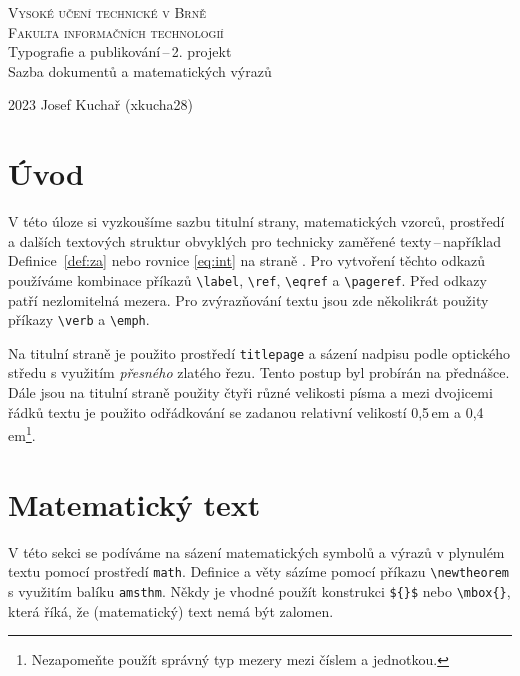 \documentclass[twocolumn,11pt]{article}
\theoremstyle{plain}
\theoremstyle{plain}
\begin{document}
\begin{titlepage}
\begin{center}
{\textsc{{\Huge Vysoké učení technické v Brně\\[0.5em]\huge{Fakulta informačních technologií}}\\}}
{\LARGE{Typografie a publikování\,--\,2. projekt}\\[0.4em]}
{\LARGE{Sazba dokumentů a matematických výrazů}}
\end{center}
{\Large 2023 \hfill Josef Kuchař (xkucha28)}
\end{titlepage}
\clearpage
\section*{Úvod}\label{page:one}
V této úloze si vyzkoušíme sazbu titulní strany, matematických vzorců,
prostředí a dalších textových struktur obvyklých pro technicky zaměřené
texty\,--\,například Definice~\ref{def:za} nebo rovnice \eqref{eq:int} na straně \pageref{page:one}. Pro vytvoření těchto
odkazů používáme kombinace příkazů \verb|\label|, \verb|\ref|, \verb|\eqref| a \verb|\pageref|.
Před odkazy patří nezlomitelná mezera. Pro zvýrazňování textu jsou zde
několikrát použity příkazy \verb|\verb| a \verb|\emph|.

Na titulní straně je použito
prostředí \verb|titlepage| a sázení nadpisu podle optického středu s využitím
\emph{přesného} zlatého řezu. Tento postup byl probírán na přednášce. Dále jsou
na titulní straně použity čtyři různé velikosti písma a mezi dvojicemi
řádků textu je použito odřádkování se zadanou relativní velikostí 0,5\,em
a 0,4\,em\footnote{Nezapomeňte použít správný typ mezery mezi číslem a jednotkou.}.

\section{Matematický text}
V této sekci se podíváme na sázení matematických symbolů a výrazů v plynulém
textu pomocí prostředí \verb|math|. Definice a věty sázíme pomocí příkazu \verb|\newtheorem|
s využitím balíku \verb|amsthm|. Někdy je vhodné použít konstrukci \verb|${}$| nebo \verb|\mbox{}|,
která říká, že (matematický) text nemá být zalomen.
\end{document}
